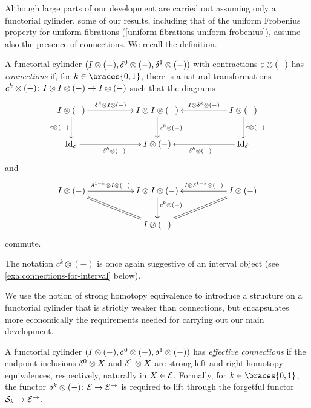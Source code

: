 \documentclass[reqno,10pt,a4paper,oneside,draft]{amsart}
\begin{document}
Although large parts of our development are carried out assuming only a functorial cylinder, some of our results, including that of the uniform Frobenius property for uniform fibrations (\cref{uniform-fibrations-uniform-frobenius}), assume also the presence of connections.
We recall the definition.

\begin{definition} \label{def:connections}
A functorial cylinder $(I \otimes (-), \delta^0 \otimes (-), \delta^1 \otimes (-))$ with contractions $\varepsilon \otimes (-)$ has \emph{connections} if, for $k \in \braces{0, 1}$, there is a natural transformations $c^k \otimes (-) \colon I \otimes I \otimes (-) \to I \otimes (-)$ such that the diagrams
\begin{equation} \label{connections:0}
\xymatrix@C+3em{
  \interval \otimes (-)
  \ar[r]^-{\kcyl \otimes \interval \otimes (-)}
  \ar[d]_{\ccyl \otimes (-)}
&
  \interval \otimes \interval \otimes (-)
  \ar[d]^{c^k \otimes (-)}
&
  \interval \otimes (-)
  \ar[l]_-{\interval \otimes \kcyl \otimes (-)}
  \ar[d]^{\ccyl \otimes (-)}
\\
  \Id_\catE
  \ar[r]_{\kcyl \otimes (-)}
&
  \interval \otimes (-)
&
  \Id_\catE
  \ar[l]^{\kcyl \otimes (-)}
}
\end{equation}
and
\begin{equation} \label{connections:1}
\xymatrix@C+3em{
  \interval \otimes (-)
  \ar[r]^-{\kcylinv \otimes \interval \otimes (-)}
  \ar@{=}[dr]
&
  \interval \otimes \interval \otimes (-)
  \ar[d]^(0.4){c^k \otimes (-)}
&
  \interval \otimes (-)
  \ar[l]_-{\interval \otimes \kcylinv \otimes (-)}
  \ar@{=}[dl]
\\&
  \interval \otimes (-)
}
\end{equation}
commute.
\end{definition}

The notation $c^k \otimes (-)$ is once again suggestive of an interval object (see \cref{exa:connections-for-interval} below).

We use the notion of strong homotopy equivalence to introduce a structure on a functorial cylinder that is strictly weaker than connections, but encapsulates more economically the requirements needed for carrying out our main development.

\begin{definition} \label{def:effective-connections}
A functorial cylinder $(I \otimes (-), \delta^0 \otimes (-), \delta^1 \otimes (-))$ has \emph{effective connections} if the endpoint inclusions $\delta^0 \otimes X$ and $\delta^1 \otimes X$ are strong left and right homotopy equivalences, respectively, naturally in $X \in \mathcal{E}$.
Formally, for $k \in \braces{0, 1}$, the functor $\delta^k \otimes (-) \colon \mathcal{E} \to \mathcal{E}^\to$ is required to lift through the forgetful functor $\mathcal{S}_k \to \mathcal{E}^\to$.
\end{definition}
\end{document}
